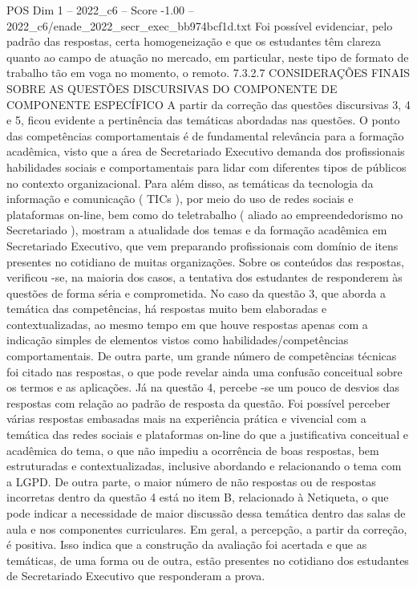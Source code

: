 \begin{textsample}{POS Dim 1 – 2022\_c6 – Score -1.00 – 2022\_c6/enade\_2022\_secr\_exec\_bb974bcf1d.txt}
Foi possível evidenciar, pelo padrão das respostas, certa homogeneização e que os estudantes têm clareza quanto ao campo de atuação no mercado, em particular, neste tipo de formato de trabalho tão em voga no momento, o remoto. 7.3.2.7 CONSIDERAÇÕES FINAIS SOBRE AS QUESTÕES DISCURSIVAS DO COMPONENTE DE COMPONENTE ESPECÍFICO A partir da correção das questões discursivas 3, 4 e 5, ficou evidente a pertinência das temáticas abordadas nas questões.
O ponto das competências comportamentais é de fundamental relevância para a formação acadêmica, visto que a área de Secretariado Executivo demanda dos profissionais habilidades sociais e comportamentais para lidar com diferentes tipos de públicos no contexto organizacional.
Para além disso, as temáticas da tecnologia da informação e comunicação ( TICs ), por meio do uso de redes sociais e plataformas on-line, bem como do teletrabalho ( aliado ao empreendedorismo no Secretariado ), mostram a atualidade dos temas e da formação acadêmica em Secretariado Executivo, que vem preparando profissionais com domínio de itens presentes no cotidiano de muitas organizações.
Sobre os conteúdos das respostas, verificou -se, na maioria dos casos, a tentativa dos estudantes de responderem às questões de forma séria e comprometida.
No caso da questão 3, que aborda a temática das competências, há respostas muito bem elaboradas e contextualizadas, ao mesmo tempo em que houve respostas apenas com a indicação simples de elementos vistos como habilidades/competências comportamentais.
De outra parte, um grande número de competências técnicas foi citado nas respostas, o que pode revelar ainda uma confusão conceitual sobre os termos e as aplicações.
Já na questão 4, percebe -se um pouco de desvios das respostas com relação ao padrão de resposta da questão.
Foi possível perceber várias respostas embasadas mais na experiência prática e vivencial com a temática das redes sociais e plataformas on-line do que a justificativa conceitual e acadêmica do tema, o que não impediu a ocorrência de boas respostas, bem estruturadas e contextualizadas, inclusive abordando e relacionando o tema com a LGPD.
De outra parte, o maior número de não respostas ou de respostas incorretas dentro da questão 4 está no item B, relacionado à Netiqueta, o que pode indicar a necessidade de maior discussão dessa temática dentro das salas de aula e nos componentes curriculares.
Em geral, a percepção, a partir da correção, é positiva.
Isso indica que a construção da avaliação foi acertada e que as temáticas, de uma forma ou de outra, estão presentes no cotidiano dos estudantes de Secretariado Executivo que responderam a prova.

\end{textsample}
